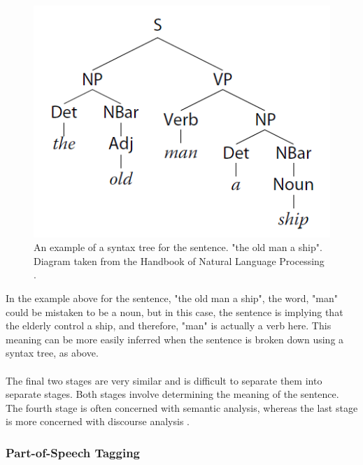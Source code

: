 \documentclass[11pt]{article}
\begin{document}
\begin{center}
\begin{figure}[H]
\begin{center}
  \includegraphics[scale=1]{syntax-tree.png}
  \caption{An example of a syntax tree for the sentence. "the old man a ship". Diagram taken from the Handbook of Natural Language Processing  \cite{RefWorks:40}.}
  \end{center}
\end{figure}
\end{center}

In the example above for the sentence, "the old man a ship", the word, "man" could be mistaken to be a noun, but in this case, the sentence is implying that the elderly control a ship, and therefore, "man" is actually a verb here. This meaning can be more easily inferred when the sentence is broken down using a syntax tree, as above.
\\
\\
The final two stages are very similar and is difficult to separate them into separate stages. Both stages involve determining the meaning of the sentence. The fourth stage is often concerned with semantic analysis, whereas the last stage is more concerned with discourse analysis \cite{RefWorks:39}.

\subsubsection{Part-of-Speech Tagging}
\end{document}
